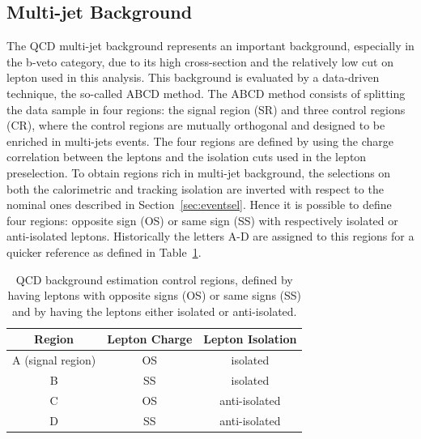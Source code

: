 \subsection{Multi-jet Background}
\label{sec:qcd}

The QCD multi-jet background represents an important background, 
especially in the b-veto category, due to its high cross-section and the 
relatively low cut on lepton \pt used in this analysis. This
background is evaluated by a data-driven technique, the so-called ABCD method.
The ABCD method consists of splitting the data sample in four regions: the
 signal region (SR) and three control regions (CR), where the control
regions are mutually orthogonal and designed to be enriched in
multi-jets events. The four regions are defined by using the charge correlation
between the leptons and the isolation cuts used in the lepton preselection. 
To obtain regions rich in multi-jet background, the selections on both
the calorimetric and tracking isolation are inverted with respect to the
nominal ones described in Section~\ref{sec:eventsel}. Hence it is
possible to define four regions: opposite sign (OS) or same sign
(SS) with respectively isolated or anti-isolated leptons. Historically
the letters A-D are assigned to this regions for a quicker reference as
defined in Table~\ref{table:qcd}.

\begin{table} [ht]
\centering
\begin{tabular}{c c c }
\hline
Region & Lepton Charge & Lepton Isolation \\ [0.5ex]
\hline
A (signal region) & OS & isolated \\
B & SS & isolated \\
C & OS & anti-isolated \\
D & SS & anti-isolated \\ [1ex]
\hline
\end{tabular}
\caption{QCD background estimation control regions, defined by having leptons with opposite signs (OS) or same signs (SS) and by having the leptons either isolated or anti-isolated.}
\label{table:qcd}
\end{table}

